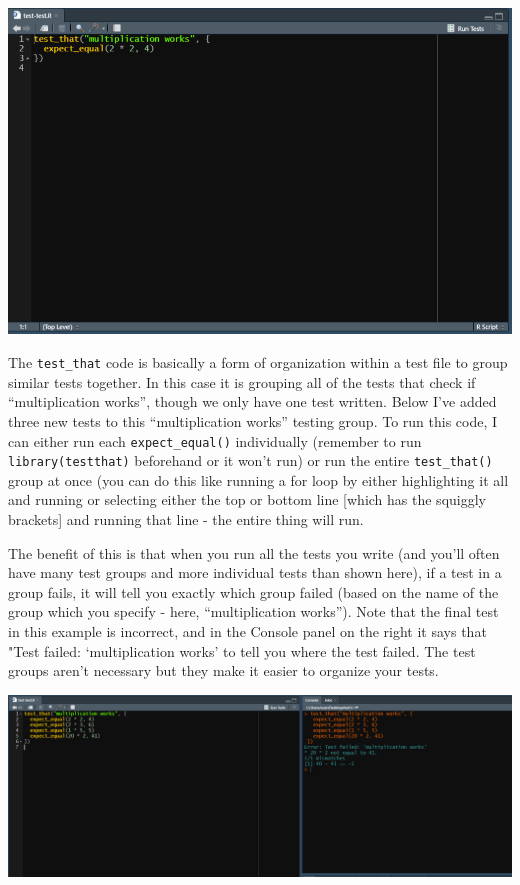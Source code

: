 \documentclass[
  12pt,
]{book}
\begin{document}
\includegraphics{images/usethis_test_default_example.PNG}

The \texttt{test\_that} code is basically a form of organization within a test file to group similar tests together. In this case it is grouping all of the tests that check if ``multiplication works'', though we only have one test written. Below I've added three new tests to this ``multiplication works'' testing group. To run this code, I can either run each \texttt{expect\_equal()} individually (remember to run \texttt{library(testthat)} beforehand or it won't run) or run the entire \texttt{test\_that()} group at once (you can do this like running a for loop by either highlighting it all and running or selecting either the top or bottom line {[}which has the squiggly brackets{]} and running that line - the entire thing will run.

The benefit of this is that when you run all the tests you write (and you'll often have many test groups and more individual tests than shown here), if a test in a group fails, it will tell you exactly which group failed (based on the name of the group which you specify - here, ``multiplication works''). Note that the final test in this example is incorrect, and in the Console panel on the right it says that "Test failed: `multiplication works' to tell you where the test failed. The test groups aren't necessary but they make it easier to organize your tests.

\includegraphics{images/usethis_test_default_example2.PNG}
\end{document}
